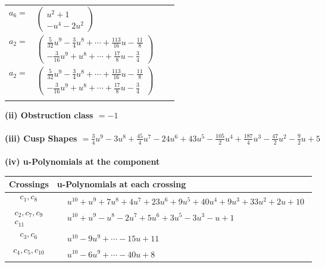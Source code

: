 \documentclass[1p]{elsarticle_modified}
\theoremstyle{definition}
\begin{document}
\begin{tabular}{m{7pt} m{180pt} m{7pt} m{180pt} }
\flushright $a_{6}=$&$\begin{pmatrix}u^2+1\\- u^4-2 u^2\end{pmatrix}$ \\
\flushright $a_{2}=$&$\begin{pmatrix}\frac{5}{32} u^9-\frac{3}{4} u^8+\cdots+\frac{113}{16} u-\frac{11}{8}\\-\frac{3}{16} u^9+u^8+\cdots+\frac{17}{8} u-\frac{3}{4}\end{pmatrix}$\\ \flushright $a_{2}=$&$\begin{pmatrix}\frac{5}{32} u^9-\frac{3}{4} u^8+\cdots+\frac{113}{16} u-\frac{11}{8}\\-\frac{3}{16} u^9+u^8+\cdots+\frac{17}{8} u-\frac{3}{4}\end{pmatrix}$\\&\end{tabular}
\flushleft \textbf{(ii) Obstruction class $= -1$}\\~\\
\flushleft \textbf{(iii) Cusp Shapes $= \frac{3}{4} u^9-3 u^8+\frac{45}{4} u^7-24 u^6+43 u^5-\frac{105}{2} u^4+\frac{187}{4} u^3-\frac{47}{2} u^2-\frac{9}{2} u+5$}\\~\\
\newpage\renewcommand{\arraystretch}{1}
\flushleft \textbf{(iv) u-Polynomials at the component}\newline \\
\begin{tabular}{m{50pt}|m{274pt}}
Crossings & \hspace{64pt}u-Polynomials at each crossing \\
\hline $$\begin{aligned}c_{1},c_{8}\end{aligned}$$&$\begin{aligned}
&u^{10}+u^9+7 u^8+4 u^7+23 u^6+9 u^5+40 u^4+9 u^3+33 u^2+2 u+10
\end{aligned}$\\
\hline $$\begin{aligned}c_{2},c_{7},c_{9}\\c_{11}\end{aligned}$$&$\begin{aligned}
&u^{10}+u^9- u^8-2 u^7+5 u^6+3 u^5-3 u^3- u+1
\end{aligned}$\\
\hline $$\begin{aligned}c_{3},c_{6}\end{aligned}$$&$\begin{aligned}
&u^{10}-9 u^9+\cdots-15 u+11
\end{aligned}$\\
\hline $$\begin{aligned}c_{4},c_{5},c_{10}\end{aligned}$$&$\begin{aligned}
&u^{10}-6 u^9+\cdots-40 u+8
\end{aligned}$\\
\hline
\end{tabular}\\~\\
\end{document}
